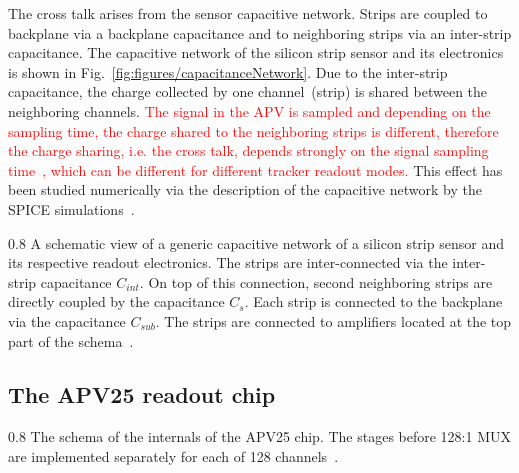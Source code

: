The cross talk arises from the sensor capacitive network. Strips are coupled to backplane via a backplane capacitance and to neighboring strips via an inter-strip capacitance. The capacitive network of the silicon strip sensor and its electronics is shown in Fig.~\ref{fig:figures/capacitanceNetwork}. Due to the inter-strip capacitance, the charge collected by one channel~(strip) is shared between the neighboring channels. \textcolor{red}{The signal in the APV is sampled and depending on the sampling time, the charge shared to the neighboring strips is different, therefore the charge sharing, i.e. the cross talk, depends strongly on the signal sampling time~\cite{Bloch:2007zza}, which can be different for different tracker readout modes.} This effect has been studied numerically via the description of the capacitive network by the SPICE simulations~\cite{Barberis:1993ph}.


                 {0.8}       %
                 {A schematic view of a generic capacitive network of a silicon strip sensor and its respective readout electronics. The strips are inter-connected via the inter-strip capacitance $C_{int}$. On top of this connection, second neighboring strips are directly coupled by the capacitance $C_{s}$. Each strip is connected to the backplane via the capacitance $C_{sub}$. The strips are connected to amplifiers located at the top part of the schema~\cite{Lutz:1987wd}.}




\subsection{The APV25 readout chip \label{sec:APV}}


                 {0.8}       %
                 {The schema of the internals of the APV25 chip. The stages before 128:1 MUX are implemented separately for each of 128 channels~\cite{Friedl:2001kra}. } %

